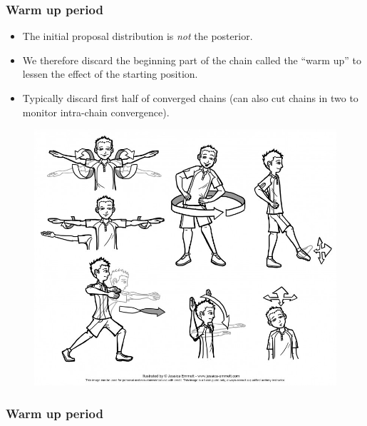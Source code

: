\documentclass[handout]{beamer}
\begin{document}
\begin{frame}
\frametitle{Warm up period}
\begin{itemize}
\item<2-> The initial proposal distribution is \textit{not} the posterior.
\item<3-> We therefore discard the beginning part of the chain called the ``warm up'' to lessen the effect of the starting position. 
\item<4-> Typically discard first half of converged chains (can also cut chains in two to monitor intra-chain convergence).
\end{itemize}

\begin{figure}[ht]
\centerline{\includegraphics[width=1.0\textwidth]{./Figures/warmup.jpg}}
\end{figure}

\end{frame}

\begin{frame}
\frametitle{Warm up period}


\end{frame}
\end{document}
